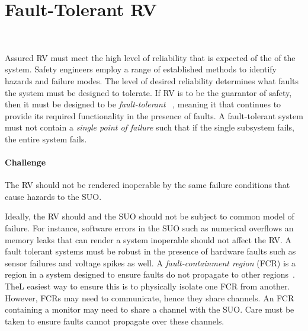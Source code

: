 \section{Fault-Tolerant RV}~\label{sec:ft}

 
Assured RV must meet the high level of reliability that is expected of
the of the system. Safety engineers employ a range of established
methods to identify hazards and failure modes. The level of desired
reliability determines what faults the system must be designed to
tolerate. If RV is to be the guarantor of safety, then it must be
designed to be \emph{fault-tolerant} ~\cite{butler-faults}, meaning it
that continues to provide its required functionality in the presence
of faults.  A fault-tolerant system must not contain a \emph{single
  point of failure} such that if the single subsystem fails, the
entire system fails.

\paragraph{Challenge}   The RV  should not be rendered inoperable by the
 same failure conditions that cause hazards to the SUO. 

 Ideally, the RV should and the SUO should not be subject to common
 model of failure.  For instance, software errors in the SUO such as
 numerical overflows an memory leaks that can render a system
 inoperable should not affect the RV.  A fault tolerant systems must
 be robust in the presence of hardware faults such as sensor failures
 and voltage spikes as well.  A \emph{fault-containment region} (FCR)
 is a region in a system designed to ensure faults do not propagate to
 other regions~\cite{Rushby01:buscompare}.   TheL
 easiest way to ensure this is to physically isolate one FCR from
 another.  However, FCRs may need to communicate, hence they share
 channels. An FCR containing a monitor may need to share a channel
 with the SUO.  Care must be taken to ensure faults cannot propagate
 over these channels.


